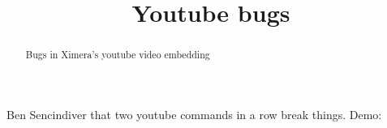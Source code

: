 \documentclass[handout]{ximera}
\title{Youtube bugs}
\begin{document}
\begin{abstract} Bugs in Ximera's youtube video embedding
\end{abstract}


\maketitle

Ben Sencindiver  that
two youtube commands in a row break things. Demo:


\end{document}
